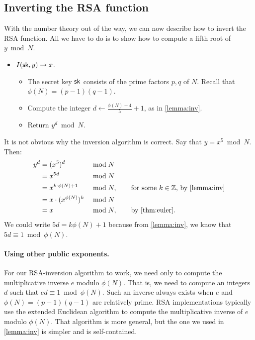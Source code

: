 \subsection{Inverting the RSA function}

With the number theory out of the way, we can now describe how
to invert the RSA function.
All we have to do is to show how to compute a fifth root of $y \bmod N$.

\begin{itemize}
  \item $I({\mathsf{sk}}, y) \to x$.
\begin{itemize}
  \item The secret key ${\mathsf{sk}}$ consists of the prime factors $p,q$ of $N$.
        Recall that $\phi(N) = (p-1)(q-1)$.
  \item Compute the integer $d \gets \frac{\phi(N) - 4}{5} + 1$, as in
    \cref{lemma:inv}.

  \item Return $y^d \bmod N$.
\end{itemize}
\end{itemize}

It is not obvious why the inversion algorithm is correct.
Say that $y = x^5 \bmod N$.
Then:
\begin{align*}
  y^d &= (x^5)^d &&\bmod N\\
      &= x^{5d} &&\bmod N\\
&= x^{k \cdot \phi(N) + 1} &&\bmod N, \qquad \text{for some $k \in \Z$, by \cref{lemma:inv}}\\
        &= x \cdot (x^{\phi(N)})^k &&\bmod N\\
&= x &&\bmod N, \qquad\text{by \cref{thm:euler}}.\\
\end{align*}
We could write $5d = k \phi(N) + 1$ because from \cref{lemma:inv},
we know that $5d \equiv 1 \bmod \phi(N)$.

\paragraph{Using other public exponents.}
For our RSA-inversion algorithm to work, we need only to
compute the multiplicative inverse $e$ modulo $\phi(N)$.
That is, we need to compute an integers $d$ such that
$ed \equiv 1 \bmod \phi(N)$.
Such an inverse always exists when $e$ and $\phi(N)=(p-1)(q-1)$ are
relatively prime.
RSA implementations typically use the extended Euclidean
algorithm to compute the multiplicative inverse of $e$ modulo $\phi(N)$.
That algorithm is more general, but the one we used in \cref{lemma:inv}
is simpler and is self-contained.

